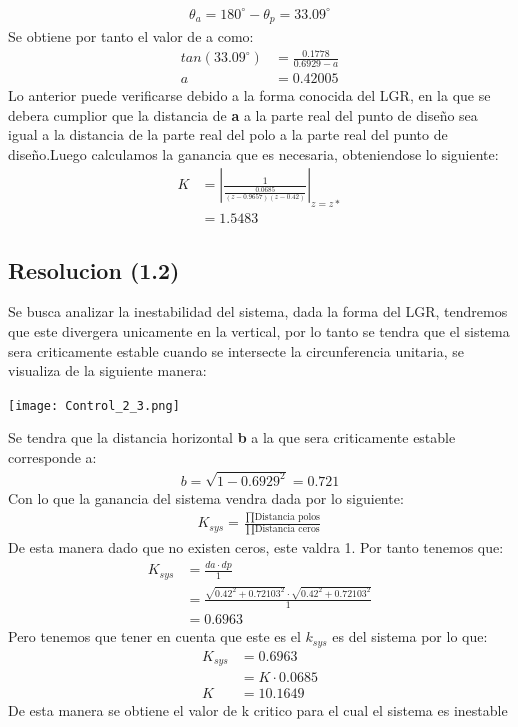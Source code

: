 \documentclass[
  11pt,
  letterpaper,
   addpoints,
   answers
  ]{exam}
\begin{document}
\begin{questions}
\begin{solution}
    \begin{align}
        \theta_{a} = 180^{\circ} - \theta_{p} = 33.09^{\circ}
    \end{align}
    Se obtiene por tanto el valor de a como:
    \begin{align}
        tan(33.09^{\circ}) &= \frac{0.1778}{0.6929-a}\\
        a &= 0.42005 
    \end{align}
    Lo anterior puede verificarse debido a la forma conocida del LGR, en la que se debera cumplior que la distancia de \textbf{a} a la parte real del punto de diseño sea igual a la distancia de la parte real del polo a la parte real del punto de diseño.Luego calculamos la ganancia que es necesaria, obteniendose lo siguiente:
    \begin{align}
        K &= \left| \frac{1}{\frac{0.0685}{(z-0.9657)(z-0.42)}}\right|_{z=z*}\\
          &=1.5483
    \end{align}
    \subsection*{Resolucion (1.2)}
    Se busca analizar la inestabilidad del sistema, dada la forma del LGR, tendremos que este divergera unicamente en la vertical, por lo tanto se tendra que el sistema sera criticamente estable cuando se intersecte la circunferencia unitaria, se visualiza de la siguiente manera:
    \begin{center}
        \texttt{[image: Control\_2\_3.png]}
    \end{center}
    Se tendra que la distancia horizontal \textbf{b} a la que sera criticamente estable corresponde a:
    \begin{align}
        b= \sqrt{1- 0.6929^{2}} = 0.721
    \end{align}
    Con lo que la ganancia del sistema vendra dada por lo siguiente:
    \begin{align}
        K_{sys} = \frac{\prod \text{Distancia polos}}{\prod \text{Distancia ceros}}
    \end{align}
    De esta manera dado que no existen ceros, este valdra 1. Por tanto tenemos que:
    \begin{align}
        K_{sys} &= \frac{da \cdot dp}{1}\\
        &= \frac{\sqrt{0.42^{2} + 0.72103^{2}} \cdot \sqrt{0.42^{2} + 0.72103^{2}}}{1}\\
        &= 0.6963
    \end{align}
    Pero tenemos que tener en cuenta que este es el $k_{sys}$ es del sistema por lo que:
    \begin{align}
        K_{sys} &= 0.6963 \\
                &= K \cdot 0.0685\\
        K &= 10.1649
    \end{align}
    De esta manera se obtiene el valor de k critico para el cual el sistema es inestable

\end{solution}
\end{questions}
\end{document}
